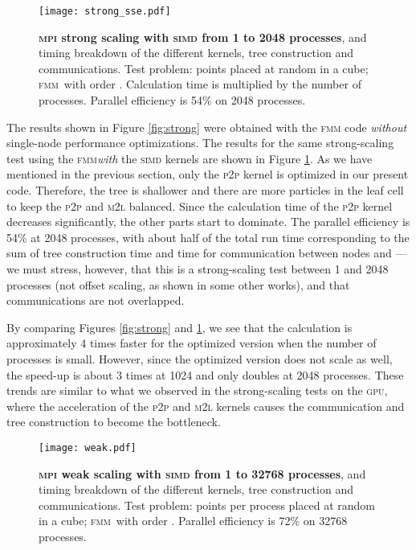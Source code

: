 \documentclass[10pt,twocolumn]{article}
\newcommand{\fmm}{\textsc{fmm}\xspace}
\newcommand{\gpu}{\textsc{gpu}}
\newcommand{\simd}{\textsc{simd}\xspace}
\newcommand{\mpi}{\textsc{mpi}\xspace}
\newcommand{\ML}{\textsc{m}2\textsc{l}\xspace}
\newcommand{\PP}{\textsc{p}2\textsc{p}\xspace}
\newlength{\up}
\begin{document}
\begin{figure}[t]
\begin{center}
\texttt{[image: strong\_sse.pdf]}
\end{center}
\vspace{-0.5em}\caption{\textbf{\mpi strong scaling with \simd from 1 to 2048 processes}, and timing breakdown of the different kernels, tree construction and communications. Test problem:  points placed at random in a cube; \fmm\ with order . Calculation time is multiplied by the number of processes. Parallel efficiency is 54\% on 2048 processes.}
\label{fig:strong_sse}
\end{figure}




The results shown in Figure \ref{fig:strong} were obtained with the \fmm code \emph{without} single-node performance optimizations. The results for the same strong-scaling test using the \fmm \emph{with} the \simd kernels are shown in Figure \ref{fig:strong_sse}. As we have mentioned in the previous section, only the \PP kernel is optimized in our present code. Therefore, the tree is shallower and there are more particles in the leaf cell to keep the \PP and \ML balanced. Since the calculation time of the \PP kernel decreases significantly, the other parts start to dominate. The parallel efficiency is 54\% at 2048 processes, with about half of the total run time corresponding to the sum of tree construction time and time for communication between nodes and ---we must stress, however, that this is a strong-scaling test between 1 and 2048 processes (not offset scaling, as shown in some other works), and that communications are not overlapped.

By comparing Figures \ref{fig:strong} and \ref{fig:strong_sse}, we see that the calculation is approximately 4 times faster for the optimized version when the number of processes is small. However, since the optimized version does not scale as well, the speed-up is about 3 times at 1024 and only doubles at 2048 processes. These trends are similar to what we observed in the strong-scaling tests on the \gpu, where the acceleration of the \PP and \ML kernels causes the communication and tree construction to become the bottleneck.

\begin{figure}[t]
\begin{center}
\texttt{[image: weak.pdf]}
\end{center}
\vspace{-0.5em}\caption{\textbf{\mpi weak scaling with \simd from 1 to 32768 processes}, and timing breakdown of the different kernels, tree construction and communications. Test problem:  points per process placed at random in a cube; \fmm\ with order . Parallel efficiency is 72\% on 32768 processes.}
\label{fig:weak}
\end{figure}
\end{document}

